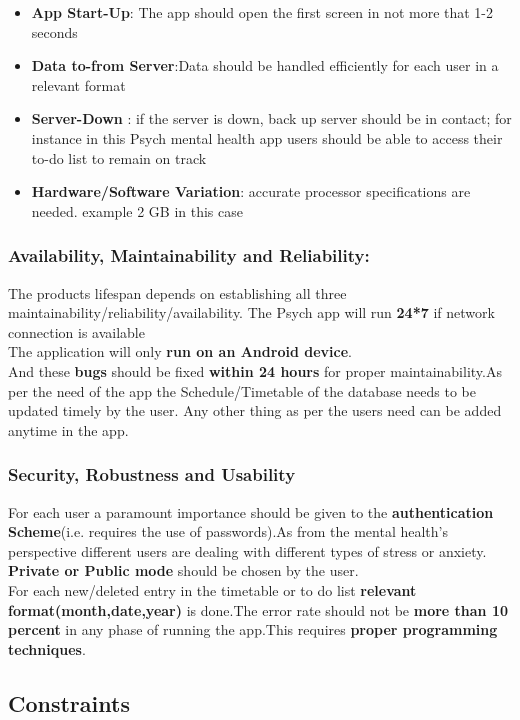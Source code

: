 \documentclass{article}
\begin{document}
\begin{itemize}
    \item \textbf{App Start-Up}: The app should open the first screen in not more that 1-2 seconds
    \item \textbf{Data to-from Server}:Data should be handled efficiently for each user in a relevant format
    \item \textbf{Server-Down} : if the server is down, back up server should be in contact; for instance in this Psych mental health app users should be able to access their to-do list to remain on track 
    \item \textbf{Hardware/Software Variation}: accurate processor specifications are needed. example 2 GB in this case
\end{itemize}

\subsubsection{\textbf{Availability, Maintainability and Reliability}:}
The products lifespan depends on establishing all three maintainability/reliability/availability. The Psych app will run \textbf{24*7} if network connection is available\\
The application will only \textbf{run on an Android device}.\\ And these \textbf{bugs} should be fixed \textbf{within 24 hours} for proper maintainability.As per the need of the app the Schedule/Timetable of the database needs to be updated timely by the user. Any other thing as per the users need can be added anytime in the app. 

\subsubsection{\textbf{Security, Robustness and Usability}}
For each user a paramount importance should be given to the \textbf{authentication Scheme}(i.e. requires the use of passwords).As from the mental health's perspective different users are dealing with different types of stress or anxiety. \textbf{Private or Public mode} should be chosen by the user.\\ For each new/deleted entry in the timetable or to do list \textbf{relevant format(month,date,year) }is done.The error rate should not be \textbf{more than 10 percent} in any phase of running the app.This requires \textbf{proper programming techniques}.


\subsection{Constraints}
\end{document}
